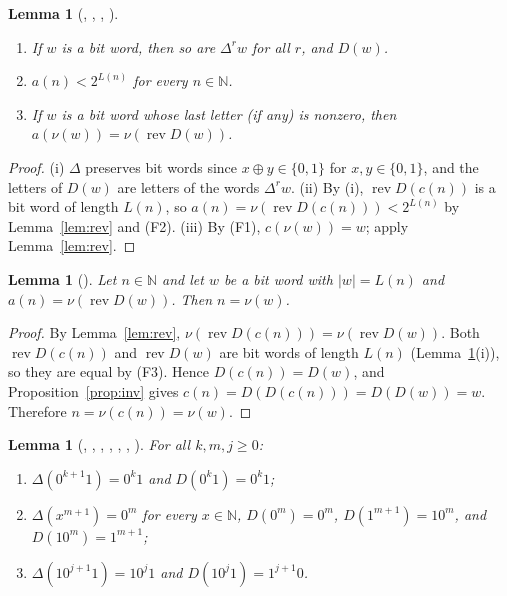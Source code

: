 \documentclass[11pt]{amsart}
\theoremstyle{plain}
\newtheorem{lemma}[theorem]{Lemma}
\theoremstyle{definition}
\newcommand{\N}{\mathbb{N}}
\newcommand{\rev}{\operatorname{rev}}
\newcommand{\len}[1]{\lvert #1\rvert}
\begin{document}
\begin{lemma}[, , , ]\label{lem:basic}
\begin{enumerate}
\item[(i)] If $w$ is a bit word, then so are $\Delta^rw$ for all $r$, and $D(w)$.
\item[(ii)] $a(n)<2^{L(n)}$ for every $n\in\N$.
\item[(iii)] If $w$ is a bit word whose last letter (if any) is nonzero, then $a(\nu(w))=\nu(\rev D(w))$.
\end{enumerate}
\end{lemma}

\begin{proof}
(i) $\Delta$ preserves bit words since $x\oplus y\in\{0,1\}$ for $x,y\in\{0,1\}$, and the letters of $D(w)$ are letters of the words $\Delta^rw$.
(ii) By (i), $\rev D(c(n))$ is a bit word of length $L(n)$, so $a(n)=\nu(\rev D(c(n)))<2^{L(n)}$ by Lemma~\ref{lem:rev} and (F2).
(iii) By (F1), $c(\nu(w))=w$; apply Lemma~\ref{lem:rev}.
\end{proof}

\begin{lemma}[]\label{lem:inj}
Let $n\in\N$ and let $w$ be a bit word with $\len w=L(n)$ and $a(n)=\nu(\rev D(w))$. Then $n=\nu(w)$.
\end{lemma}

\begin{proof}
By Lemma~\ref{lem:rev}, $\nu(\rev D(c(n)))=\nu(\rev D(w))$. Both $\rev D(c(n))$ and $\rev D(w)$ are bit words of length $L(n)$ (Lemma~\ref{lem:basic}(i)), so they are equal by (F3). Hence $D(c(n))=D(w)$, and Proposition~\ref{prop:inv} gives $c(n)=D(D(c(n)))=D(D(w))=w$. Therefore $n=\nu(c(n))=\nu(w)$.
\end{proof}


\begin{lemma}[, , , , , , ]\label{lem:words}
For all $k,m,j\ge0$:
\begin{enumerate}
\item[(a)] $\Delta(0^{k+1}1)=0^k1$ and $D(0^k1)=0^k1$;
\item[(b)] $\Delta(x^{m+1})=0^m$ for every $x\in\N$, $D(0^m)=0^m$, $D(1^{m+1})=10^m$, and $D(10^m)=1^{m+1}$;
\item[(c)] $\Delta(10^{j+1}1)=10^j1$ and $D(10^j1)=1^{j+1}0$.
\end{enumerate}
\end{lemma}
\end{document}
